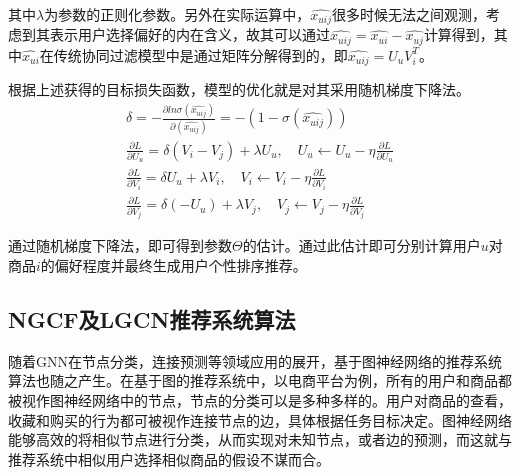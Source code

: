 \documentclass[lang=cn,11pt,a4paper,cite=authoryear]{elegantpaper}
\begin{document}
其中$\lambda$为参数的正则化参数。另外在实际运算中，$\hat{x_{uij}}$很多时候无法之间观测，考虑到其表示用户选择偏好的内在含义，故其可以通过$\hat{x_{uij}} = \hat{x_{ui}}-\hat{x_{uj}}$计算得到，其中$\hat{x_{ui}}$在传统协同过滤模型中是通过矩阵分解得到的，即$\hat{x_{uij}} = U_uV_i^T$。

根据上述获得的目标损失函数，模型的优化就是对其采用随机梯度下降法。
\begin{gather}
  \delta = -\frac{\partial ln\sigma(\hat{x_{uij}})}{\partial(\hat{x_{uij}})} = -(1-\sigma (\hat{x_{uij}})) \\
  \frac{\partial L}{\partial U_u} = \delta(V_i-V_j)+\lambda U_u , \quad U_u \leftarrow U_u - \eta \frac{\partial L}{\partial U_u} \\
  \frac{\partial L}{\partial V_i} = \delta U_u+\lambda V_i , \quad V_i \leftarrow V_i - \eta \frac{\partial L}{\partial V_i} \\
  \frac{\partial L}{\partial V_j} = \delta (-U_u)+\lambda V_j , \quad V_j \leftarrow V_j - \eta \frac{\partial L}{\partial V_j} 
\end{gather}

通过随机梯度下降法，即可得到参数$\Theta$的估计。通过此估计即可分别计算用户$u$对商品$i$的偏好程度并最终生成用户个性排序推荐。

\subsection{NGCF及LGCN推荐系统算法}
随着GNN在节点分类，连接预测等领域应用的展开，基于图神经网络的推荐系统算法也随之产生。在基于图的推荐系统中，以电商平台为例，所有的用户和商品都被视作图神经网络中的节点，节点的分类可以是多种多样的。用户对商品的查看，收藏和购买的行为都可被视作连接节点的边，具体根据任务目标决定。图神经网络能够高效的将相似节点进行分类，从而实现对未知节点，或者边的预测，而这就与推荐系统中相似用户选择相似商品的假设不谋而合。
\end{document}
